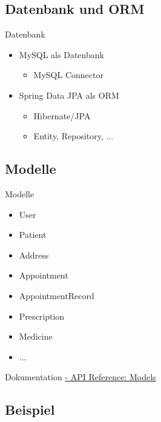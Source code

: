 \documentclass{beamer}
\begin{document}
\subsection{Datenbank und ORM}

\begin{frame}{Datenbank}
	
	\begin{itemize}
		\item MySQL als Datenbank
		      \begin{itemize}
		      	\item MySQL Connector
		      \end{itemize}
		\item Spring Data JPA als ORM
		      \begin{itemize}
		      	\item Hibernate/JPA
		      	\item Entity, Repository, ...
		      \end{itemize}
	\end{itemize}
	
\end{frame}

\subsection{Modelle}


\begin{frame}{Modelle}
	
	\begin{itemize}
		\item User
		\item Patient
		\item Address
		\item Appointment
		\item AppointmentRecord
		\item Prescription
		\item Medicine
		\item ...
	\end{itemize}
	
	\vskip 1cm
	
	\begin{block}{Dokumentation}
		\href{https://termin-api.docs.stoplight.io/models}{- API Reference: Models}
	\end{block}
	
\end{frame}


\subsection{Beispiel}
\end{document}
